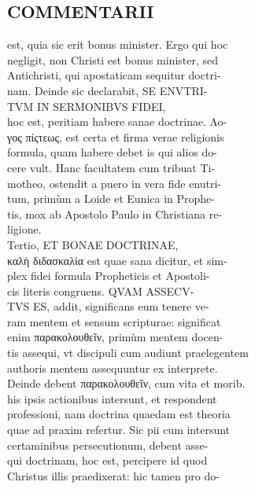 \documentclass{article}
\begin{document}
\begin{pages}
\section*{COMMENTARII \\
                }est, quia sic erit bonus minister. Ergo qui hoc \\
                negligit, non Christi est bonus minister, sed \\
                Antichristi, qui apostaticam sequitur doctri- \\
                nam. Deinde sic declarabit, SE ENVTRI- \\
                TVM IN SERMONIBVS FIDEI, \\
                hoc est, peritiam habere sanae doctrinae. Λo- \\
                γος πίςτεως, est certa et firma verae religionis \\
                formula, quam habere debet is qui alios do- \\
                cere vult. Hanc facultatem cum tribuat Ti- \\
                motheo, ostendit a puero in vera fide enutri- \\
                tum, primùm a Loide et Eunica in Prophe- \\
                tis, mox ab Apostolo Paulo in Christiana re- \\
                ligione. \\
                Tertio, ET BONAE DOCTRINAE, \\
                καλὴ διδασκαλία est quae sana dicitur, et sim- \\
                plex fidei formula Propheticis et Apostoli- \\
                cis literis congruens. QVAM ASSECV- \\
                TVS ES, addit, significans eum tenere ve- \\
                ram mentem et sensum scripturae: significat \\
                enim παρακολουθεῖν, primùm mentem docen- \\
                tis assequi, vt discipuli cum audiunt praelegentem \\
                authoris mentem assequuntur ex interprete. \\
                Deinde debent παρακολουθεῖν, cum vita et morib. \\
                his ipsis actionibus intersunt, et respondent \\
                professioni, nam doctrina quaedam est theoria \\
                quae ad praxim refertur. Sic pii cum intersunt \\
                certaminibus persecutionum, debent asse- \\
                qui doctrinam, hoc est, percipere id quod \\
                Christus illis praedixerat: hic tamen pro do- \\
                

\end{pages}
\end{document}
